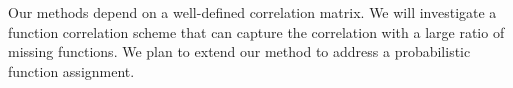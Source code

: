 \documentclass{llncs} %
\begin{document}
Our methods depend on a well-defined correlation matrix. We will investigate a function correlation scheme that can capture the correlation with a large ratio of missing functions. We plan to extend our method to address a probabilistic function assignment.
\begin{comment}
\section{Acknowledgements}
This work is partially supported by grants from Natural Science Foundation of China (Project Nos. 60973083, 61070090, 61003174 and 61170080), grants from the NSFC-Guangdong Joint Fund (Project No. U1035004 and U1135004) and China Scholarship Council (CSC).
\end{comment}


\end{document}
